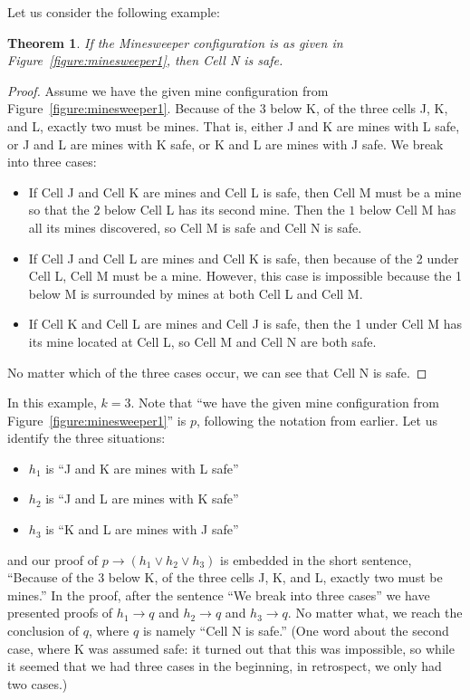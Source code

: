 \documentclass{book}
\newcounter{ekcounter}%
\theoremstyle{ekimcustom}
\newtheorem{theorem}[ekcounter]{Theorem}
\begin{document}
Let us consider the following example:
\begin{theorem}
If the Minesweeper configuration is as given in Figure~\ref{figure:minesweeper1}, then Cell N is safe.
\end{theorem}
\begin{proof}
Assume we have the given mine configuration from Figure~\ref{figure:minesweeper1}.
Because of the 3 below K, of the three cells J, K, and L, exactly two must be mines. That is, either J and K are mines with L safe, or J and L are mines with K safe, or K and L are mines with J safe. We break into three cases:
\begin{itemize}
\item If Cell J and Cell K are mines and Cell L is safe, then Cell M must be a mine so that the $2$ below Cell L has its second mine. Then the $1$ below Cell M has all its mines discovered, so Cell M is safe and Cell N is safe.
\item If Cell J and Cell L are mines and Cell K is safe, then because of the 2 under Cell L, Cell M must be a mine. However, this case is impossible because the 1 below M is surrounded by mines at both Cell L and Cell M.
\item If Cell K and Cell L are mines and Cell J is safe, then the 1 under Cell M has its mine located at Cell L, so Cell M and Cell N are both safe.
\end{itemize}
No matter which of the three cases occur, we can see that Cell N is safe.
\end{proof}
In this example, $k=3$. Note that ``we have the given mine configuration from Figure~\ref{figure:minesweeper1}'' is $p$, following the notation from earlier. Let us identify the three situations:
\begin{itemize}
\item $h_1$ is ``J and K are mines with L safe''
\item $h_2$ is ``J and L are mines with K safe''
\item $h_3$ is ``K and L are mines with J safe''
\end{itemize}
and our proof of $p \rightarrow (h_1 \vee h_2 \vee h_3)$ is embedded in the short sentence, ``Because of the 3 below K, of the three cells J, K, and L, exactly two must be mines.'' In the proof, after the sentence ``We break into three cases'' we have presented proofs of $h_1 \rightarrow q$ and $h_2 \rightarrow q$ and $h_3 \rightarrow q$. No matter what, we reach the conclusion of $q$, where $q$ is namely ``Cell N is safe.'' (One word about the second case, where K was assumed safe: it turned out that this was impossible, so while it seemed that we had three cases in the beginning, in retrospect, we only had two cases.)
\end{document}
